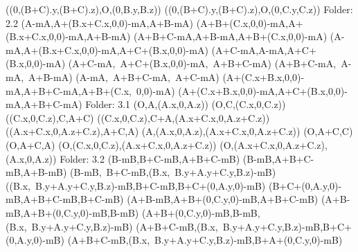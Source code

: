 \left(\left(0,\left(B+C\right).y,\left(B+C\right).z\right),O,\left(0,B.y,B.z\right)\right)
\left(\left(0,\left(B+C\right).y,\left(B+C\right).z\right),O,\left(0,C.y,C.z\right)\right)
Folder: 2.2
\left(A-mA,A+\left(B.x+C.x,0,0\right)-mA,A+B-mA\right)
\left(A+B+\left(C.x,0,0\right)-mA,A+\left(B.x+C.x,0,0\right)-mA,A+B-mA\right)
\left(A+B+C-mA,A+B-mA,A+B+\left(C.x,0,0\right)-mA\right)
\left(A-mA,A+\left(B.x+C.x,0,0\right)-mA,A+C+\left(B.x,0,0\right)-mA\right)
\left(A+C-mA,A-mA,A+C+\left(B.x,0,0\right)-mA\right)
\left(A+C-mA,\ A+C+\left(B.x,0,0\right)-mA,\ A+B+C-mA\right)
\left(A+B+C-mA,\ A-mA,\ A+B-mA\right)
\left(A-mA,\ A+B+C-mA,\ A+C-mA\right)
\left(A+\left(C.x+B.x,0,0\right)-mA,A+B+C-mA,A+B+\left(C.x,\ 0,0\right)-mA\right)
\left(A+\left(C.x+B.x,0,0\right)-mA,A+C+\left(B.x,0,0\right)-mA,A+B+C-mA\right)
Folder: 3.1
\left(O,A,\left(A.x,0,A.z\right)\right)
\left(O,C,\left(C.x,0,C.z\right)\right)
\left(\left(C.x,0,C.z\right),C,A+C\right)
\left(\left(C.x,0,C.z\right),C+A,\left(A.x+C.x,0,A.z+C.z\right)\right)
\left(\left(A.x+C.x,0,A.z+C.z\right),A+C,A\right)
\left(A,\left(A.x,0,A.z\right),\left(A.x+C.x,0,A.z+C.z\right)\right)
\left(O,A+C,C\right)
\left(O,A+C,A\right)
\left(O,\left(C.x,0,C.z\right),\left(A.x+C.x,0,A.z+C.z\right)\right)
\left(O,\left(A.x+C.x,0,A.z+C.z\right),\left(A.x,0,A.z\right)\right)
Folder: 3.2
\left(B-mB,B+C-mB,A+B+C-mB\right)
\left(B-mB,A+B+C-mB,A+B-mB\right)
\left(B-mB,\ B+C-mB,\left(B.x,\ B.y+A.y+C.y,B.z\right)-mB\right)
\left(\left(B.x,\ B.y+A.y+C.y,B.z\right)-mB,B+C-mB,B+C+\left(0,A.y,0\right)-mB\right)
\left(B+C+\left(0,A.y,0\right)-mB,A+B+C-mB,B+C-mB\right)
\left(A+B-mB,A+B+\left(0,C.y,0\right)-mB,A+B+C-mB\right)
\left(A+B-mB,A+B+\left(0,C.y,0\right)-mB,B-mB\right)
\left(A+B+\left(0,C.y,0\right)-mB,B-mB,\left(B.x,\ B.y+A.y+C.y,B.z\right)-mB\right)
\left(A+B+C-mB,\left(B.x,\ B.y+A.y+C.y,B.z\right)-mB,B+C+\left(0,A.y,0\right)-mB\right)
\left(A+B+C-mB,\left(B.x,\ B.y+A.y+C.y,B.z\right)-mB,B+A+\left(0,C.y,0\right)-mB\right)
